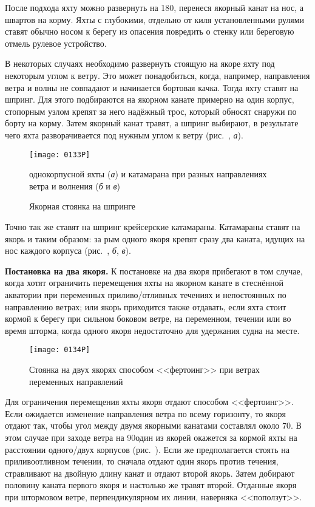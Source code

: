 После подхода яхту можно развернуть на 180\gr, перенеся якорный канат
на нос, а швартов на корму. Яхты с глубокими, отдельно от киля
установленными рулями ставят обычно носом к берегу из опасения
повредить о стенку или береговую отмель рулевое устройство.

В некоторых случаях необходимо развернуть стоящую на якоре яхту под
некоторым углом к ветру. Это может понадобиться, когда, например,
направления ветра и волны не совпадают и начинается бортовая
качка. Тогда яхту ставят на шпринг. Для этого подбираются на якорном
канате примерно на один корпус, стопорным узлом крепят за него
надёжный трос, который обносят снаружи по борту на корму. Затем
якорный канат травят, а шпринг выбирают, в результате чего яхта
разворачивается под нужным углом к ветру (рис.~, \textit{а}).

\begin{figure*}[!htb]
  \centering{}
  \texttt{[image: 0133P]}
  \caption{Якорная стоянка на шпринге}
  \label{fig:133}
  \small
  \centering{}
  однокорпусной яхты (\textit{а}) и катамарана при разных направлениях ветра и волнения (\textit{б} и \textit{в})
\end{figure*}

Точно так же ставят на шпринг крейсерские катамараны. Катамараны
ставят на якорь и таким образом: за рым одного якоря крепят сразу два
каната, идущих на нос каждого корпуса (рис.~, \textit{б},
\textit{в}).

\textbf{Постановка на два якоря.} К постановке на два якоря прибегают
в том случае, когда хотят ограничить перемещения яхты на якорном
канате в стеснённой акватории при переменных приливо\-/отливных
течениях и непостоянных по направлению ветрах; или якорь приходится
также отдавать, если яхта стоит кормой к берегу при сильном боковом
ветре, на переменном, течении или во время шторма, когда одного якоря
недостаточно для удержания судна на месте.

\begin{figure}[!htb]
  \centering{}
  \texttt{[image: 0134P]}
  \caption{Стоянка на двух якорях способом <<фертоинг>> при ветрах
    переменных направлений}
  \label{fig:134}
\end{figure}

Для ограничения перемещения яхты якоря отдают способом
<<фертоинг>>. Если ожидается изменение направления ветра по всему
горизонту, то якоря отдают так, чтобы угол между двумя якорными
канатами составлял около 70\gr. В этом случае при заходе ветра
на 90\gr один из якорей окажется за кормой яхты на расстоянии
одного\-/двух корпусов (рис.~). Если же предполагается стоять
на приливоотливном течении, то сначала отдают один якорь против
течения, стравливают на двойную длину канат и отдают второй
якорь. Затем добирают половину каната первого якоря и настолько же
травят второй. Отданные якоря при штормовом ветре, перпендикулярном их
линии, наверняка <<поползут>>.

